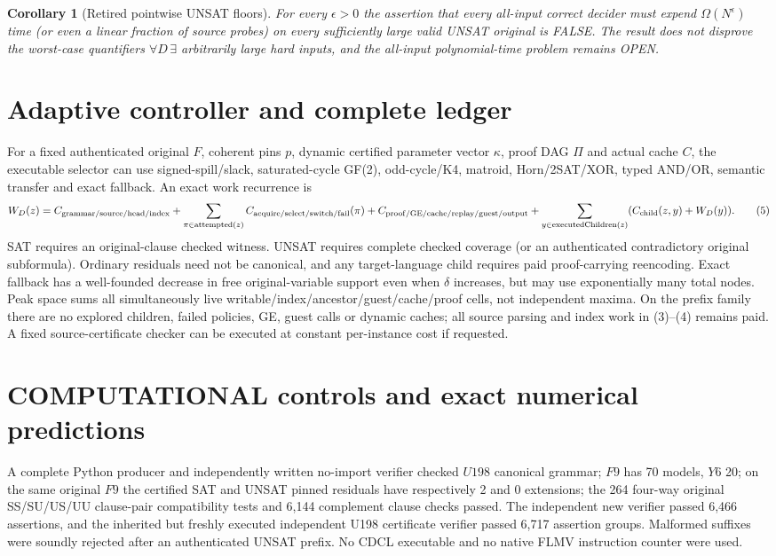 \documentclass[11pt]{article}
\newtheorem{corollary}[theorem]{Corollary}
\begin{document}
\begin{corollary}[Retired pointwise UNSAT floors]
For every $\epsilon>0$ the assertion that \emph{every} all-input
correct decider must expend $\Omega(N^\epsilon)$ time (or even a
linear fraction of source probes) on \emph{every sufficiently large}
valid UNSAT original is FALSE. The result does \emph{not} disprove the
worst-case quantifiers $\forall D\,\exists$ arbitrarily large hard
inputs, and the all-input polynomial-time problem remains OPEN.
\end{corollary}

\section{Adaptive controller and complete ledger}
For a fixed authenticated original $F$, coherent pins $p$, dynamic
certified parameter vector $\kappa$, proof DAG $\Pi$ and actual cache
$C$, the executable selector can use signed-spill/slack, saturated-cycle
GF(2), odd-cycle/K4, matroid, Horn/2SAT/XOR, typed AND/OR,
semantic transfer and exact fallback. An exact work recurrence is
\[
 W_D(z)=C_{\rm grammar/source/head/index}
 +\sum_{\pi\in\mathrm{attempted}(z)}C_{\rm acquire/select/switch/fail}(\pi)
 +C_{\rm proof/GE/cache/replay/guest/output}
 +\sum_{y\in\mathrm{executedChildren}(z)}
 (C_{\rm child}(z,y)+W_D(y)).
\tag{5}
\]
SAT requires an original-clause checked witness. UNSAT requires complete
checked coverage (or an authenticated contradictory original subformula).
Ordinary residuals need not be canonical, and any target-language child
requires paid proof-carrying reencoding. Exact fallback has a well-founded
decrease in free original-variable support even when $\delta$ increases,
but may use exponentially many total nodes. Peak space sums all
simultaneously live writable/index/ancestor/guest/cache/proof cells, not
independent maxima. On the prefix family there are no explored children,
failed policies, GE, guest calls or dynamic caches; all source parsing
and index work in (3)--(4) remains paid. A fixed source-certificate
checker can be executed at constant per-instance cost if requested.

\section{COMPUTATIONAL controls and exact numerical predictions}
A complete Python producer and independently written no-import verifier
checked $U198$ canonical grammar; $F9$ has 70 models, $Y6$ 20;
on the same original $F9$ the certified SAT and UNSAT pinned residuals
have respectively 2 and 0 extensions; the 264 four-way original
SS/SU/US/UU clause-pair compatibility tests and 6,144 complement
clause checks passed. The independent new verifier passed 6,466
assertions, and the inherited but freshly executed independent U198
certificate verifier passed 6,717 assertion groups. Malformed suffixes
were soundly rejected after an authenticated UNSAT prefix. No CDCL
executable and no native FLMV instruction counter were used.
\end{document}
